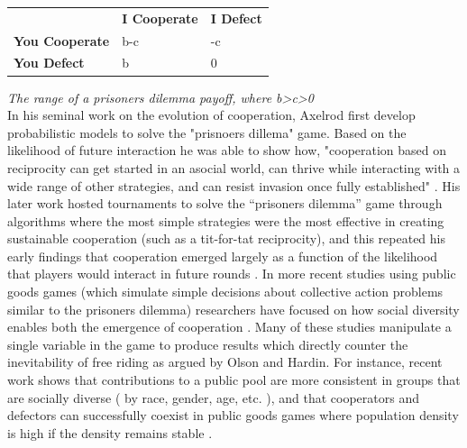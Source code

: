 \documentclass[thesis,tocnosub,noragright,centerchapter,12pt]{uiucecethesis09}
\begin{document}
\begin{table}[h]
\begin{tabular}{lll}
             & \textbf{I Cooperate} & \textbf{I Defect} \\
\textbf{You Cooperate} & b-c         & -c        \\
\textbf{You Defect}    & b           & 0       
\end{tabular}
\end{table}

\textit{The range of a prisoners dilemma payoff, where b>c>0}\\

In his seminal work on the evolution of cooperation, Axelrod first develop probabilistic models to solve the "prisnoers dillema" game. Based on the likelihood of future interaction he was able to show how, "cooperation based on reciprocity can get started in an asocial world, can thrive while interacting with a wide range of other strategies, and can resist invasion once fully established" \citep{axelrod1981evolution}. His later work hosted tournaments to solve the ``prisoners dilemma'' game  through algorithms where the most simple strategies were the most effective in creating
sustainable cooperation (such as a tit-for-tat reciprocity), and this repeated his early findings that
cooperation emerged largely as a function of the likelihood that players would
interact in future rounds \citeyear{axelrod2006evolution}. In more recent studies using public
goods games (which simulate simple decisions about collective action
problems similar to the prisoners dilemma) researchers have focused
on how social diversity enables both the emergence of cooperation \citep[for a thorough overview see][]{perc2010coevolutionary}. Many of these studies manipulate a single variable in the game to
produce results which directly counter the inevitability of free riding
as argued by Olson and Hardin. For instance, recent work shows that
contributions to a public pool are more consistent in groups that are
socially diverse ( by race, gender, age, etc. \citeyearpar{santos2008social}), and that cooperators and defectors can
successfully coexist in public goods games where population density is
high if the density remains stable \citep{hauert2006evolutionary}.\\
\end{document}
